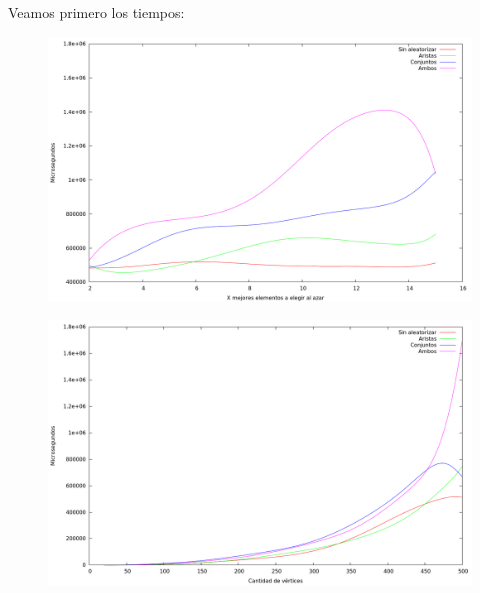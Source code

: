 Veamos primero los tiempos:

\vspace*{0.5cm}

\begin{figure}[H]
  \begin{center}
    \includegraphics[scale=0.35]{imagenes/grasp-local-x-tiempo.png}
  \end{center}
\end{figure}

\vspace*{0.5cm}

\vspace*{0.5cm}

\begin{figure}[H]
  \begin{center}
    \includegraphics[scale=0.35]{imagenes/grasp-local-n-tiempo.png}
  \end{center}
\end{figure}

